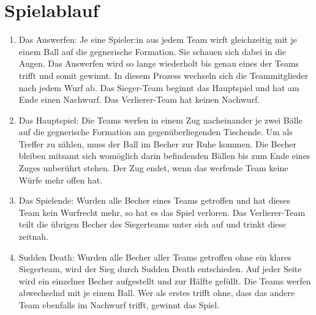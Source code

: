 \section{Spielablauf}\label{Bier-Pong:Spielablauf}
\begin{enumerate}[label={(\arabic*)}]
    \item
    Das Auswerfen: Je eine Spieler:in aus jedem Team wirft gleichzeitig mit je einem Ball auf die gegnerische Formation.
    Sie schauen sich dabei in die Augen. Das Auswerfen wird so lange wiederholt bis genau eines der Teams trifft und somit gewinnt.
    In diesem Prozess wechseln sich die Teammitglieder nach jedem Wurf ab.
    Das Sieger-Team beginnt das Hauptspiel und hat am Ende einen Nachwurf.
    Das Verlierer-Team hat keinen Nachwurf.

    \item
    Das Hauptspiel: Die Teams werfen in einem Zug nacheinander je zwei Bälle auf die gegnerische Formation am gegenüberliegenden Tischende.
    Um als Treffer zu zählen, muss der Ball im Becher zur Ruhe kommen.
    Die Becher bleiben mitsamt sich womöglich darin befindenden Bällen bis zum Ende eines Zuges unberührt stehen.
    Der Zug endet, wenn das werfende Team keine Würfe mehr offen hat.

    \item
    Das Spielende: Wurden alle Becher eines Teams getroffen und hat dieses Team kein Wurfrecht mehr, so hat es das Spiel verloren.
    Das Verlierer-Team teilt die übrigen Becher des Siegerteams unter sich auf und trinkt diese zeitnah.

    \item
    \glqq{}Sudden Death\grqq{}: Wurden alle Becher aller Teams getroffen ohne ein klares Siegerteam, wird der Sieg durch Sudden Death entschieden.
    Auf jeder Seite wird ein einzelner Becher aufgestellt und zur Hälfte gefüllt.
    Die Teams werfen abwechselnd mit je einem Ball.
    Wer als erstes trifft ohne, dass das andere Team ebenfalls im Nachwurf trifft, gewinnt das Spiel.
\end{enumerate}
    
